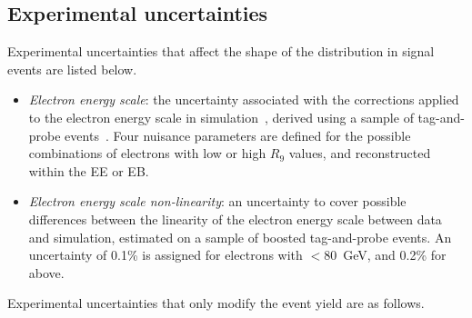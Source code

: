 \subsection{Experimental uncertainties}

Experimental uncertainties that affect the shape of the \mee distribution in signal events are listed below.
   
\begin{itemize}
\item \textit{Electron energy scale}:
  the uncertainty associated with the corrections applied to the electron energy scale in simulation~\cite{CMS_egamma_performance}, derived using a sample of \Zee tag-and-probe events~\cite{TagAndProbe}. Four nuisance parameters are defined for the possible combinations of electrons with low or high $R_{9}$ values, and reconstructed within the EE or EB. %
\item \textit{Electron energy scale non-linearity}:
  an uncertainty to cover possible differences between the linearity of the electron energy scale between data and simulation, estimated on a sample of boosted tag-and-probe events. An uncertainty of 0.1\% is assigned for electrons with \pt$<80$~GeV, and 0.2\% for above.
\end{itemize}
   
\noindent Experimental uncertainties that only modify the event yield are as follows.

